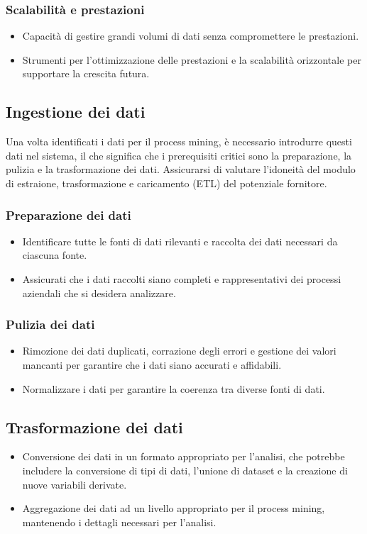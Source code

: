 \documentclass{article}
\begin{document}
\subsubsection{Scalabilità e prestazioni}
\begin{itemize}
    \item Capacità di gestire grandi volumi di dati senza compromettere le prestazioni.
    \item Strumenti per l'ottimizzazione delle prestazioni e la scalabilità orizzontale per supportare la crescita futura.
\end{itemize}
\subsection{Ingestione dei dati}
Una volta identificati i dati per il process mining, è necessario introdurre questi dati nel sistema, il che significa che i prerequisiti critici sono la preparazione, la pulizia e la trasformazione dei dati. Assicurarsi di valutare l'idoneità del modulo di estraione, trasformazione e caricamento (ETL) del potenziale fornitore.
\subsubsection{Preparazione dei dati}
\begin{itemize}
    \item Identificare tutte le fonti di dati rilevanti e raccolta dei dati necessari da ciascuna fonte.
    \item Assicurati che i dati raccolti siano completi e rappresentativi dei processi aziendali che si desidera analizzare.
\end{itemize}
\subsubsection{Pulizia dei dati}
\begin{itemize}
    \item Rimozione dei dati duplicati, corrazione degli errori e gestione dei valori mancanti per garantire che i dati siano accurati e affidabili.
    \item Normalizzare i dati per garantire la coerenza tra diverse fonti di dati.
\end{itemize}
\subsection{Trasformazione dei dati}
\begin{itemize}
    \item Conversione dei dati in un formato appropriato per l'analisi, che potrebbe includere la conversione di tipi di dati, l'unione di dataset e la creazione di nuove variabili derivate.
    \item Aggregazione dei dati ad un livello appropriato per il process mining, mantenendo i dettagli necessari per l'analisi.
\end{itemize}
\end{document}
